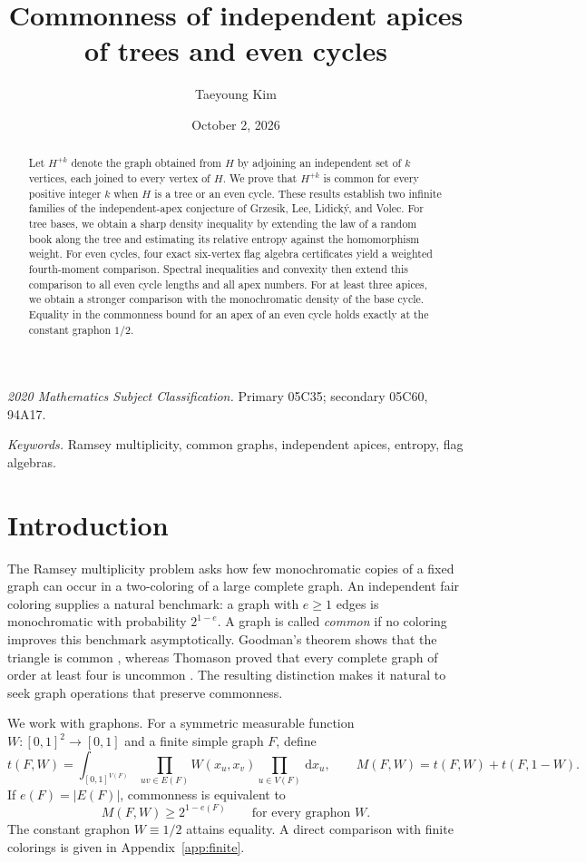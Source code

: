 \documentclass[11pt,a4paper]{article}
\title{Commonness of independent apices of trees and even cycles}
\author{Taeyoung Kim}
\date{October 2, 2026}
\theoremstyle{remark}
\numberwithin{equation}{section}
\newcommand{\dd}{\,\mathrm d}
\begin{document}
\maketitle

\begin{abstract}
Let $H^{+k}$ denote the graph obtained from $H$ by adjoining an
independent set of $k$ vertices, each joined to every vertex of $H$.
We prove that $H^{+k}$ is common for every positive integer $k$ when
$H$ is a tree or an even cycle. These results establish two infinite
families of the independent-apex conjecture of Grzesik, Lee,
Lidick\'y, and Volec. For tree bases, we obtain a sharp density
inequality by extending the law of a random book along the tree and
estimating its relative entropy against the homomorphism weight. For even
cycles, four exact six-vertex flag algebra certificates yield a
weighted fourth-moment comparison. Spectral inequalities and
convexity then extend this comparison to all even cycle lengths and
all apex numbers. For at least three apices, we obtain a stronger
comparison with the monochromatic density of the base cycle. Equality
in the commonness bound for an apex of an even cycle holds exactly
at the constant graphon $1/2$.
\end{abstract}

\smallskip
\noindent\textit{2020 Mathematics Subject Classification.}
Primary 05C35; secondary 05C60, 94A17.
\par\smallskip
\noindent\textit{Keywords.} Ramsey multiplicity, common graphs,
independent apices, entropy, flag algebras.

\section{Introduction}\label{sec:intro}

The Ramsey multiplicity problem asks how few monochromatic copies
of a fixed graph can occur in a two-coloring of a large complete
graph. An independent fair coloring supplies a natural benchmark:
a graph with $e\geq1$ edges is monochromatic with probability $2^{1-e}$.
A graph is called \emph{common} if no coloring improves this
benchmark asymptotically. Goodman's theorem shows that the triangle
is common \cite{Goodman}, whereas Thomason proved that every
complete graph of order at least four is uncommon \cite{Thomason}.
The resulting distinction makes it natural to seek graph operations
that preserve commonness.

We work with graphons. For a symmetric measurable function
$W:[0,1]^2\to[0,1]$ and a finite simple graph $F$, define
\[
 t(F,W)=\int_{[0,1]^{V(F)}}\prod_{uv\in E(F)}W(x_u,x_v)
                    \prod_{u\in V(F)}\dd x_u,
 \qquad M(F,W)=t(F,W)+t(F,1-W).
\]
If $e(F)=|E(F)|$, commonness is equivalent to
\begin{equation}\label{eq:common}
 M(F,W)\geq2^{1-e(F)}\qquad\text{for every graphon }W.
\end{equation}
The constant graphon $W\equiv1/2$ attains equality. A direct
comparison with finite colorings is given in
Appendix~\ref{app:finite}.
\end{document}
